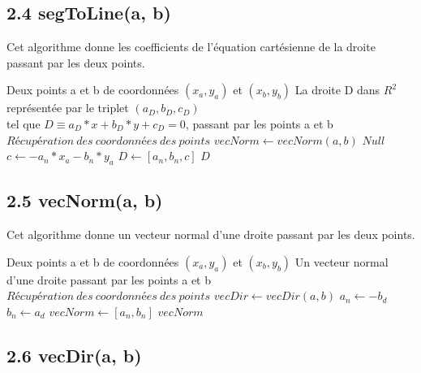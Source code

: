 \documentclass[a4paper,12pt]{report}	%
\begin{document}
	{\subsection*{2.4 segToLine(a, b)}}
	
	\noindent Cet algorithme donne les coefficients de l'équation cartésienne de la droite passant par les deux points.
	
	\begin{algorithm}
	\caption{$segToLine(a, b)$}
	\label{Modele pour un algo}
	\begin{algorithmic} [1]
	\REQUIRE Deux points a et b de coordonnées $(x_{a}, y_{a})$ et $(x_{b}, y_{b})$
	\ENSURE La droite D dans $R^2$ représentée par le triplet $(a_{D}, b_{D}, c_{D})$ \\tel que $D \equiv a_{D}*x + b_{D}*y + c_{D} = 0$, passant par les points a et b
	\STATE $Récupération\ des\ coordonnées\ des\ points$
	\STATE $ vecNorm \gets vecNorm(a, b) $
	\RETURN $Null$
	\ELSE
	\STATE $ c \gets - a_{n}*x_{a} - b_{n}*y_{a} $
	\STATE $ D \gets [a_{n}, b_{n}, c] $
	\RETURN $D$
	\ENDIF
	\end{algorithmic}
	\end{algorithm}
	
	{\subsection*{2.5 vecNorm(a, b)}}
	
	\noindent Cet algorithme donne un vecteur normal d'une droite passant par les deux points.
	
	\begin{algorithm}
	\caption{$vecNorm(a, b)$}
	\label{Modele pour un algo}
	\begin{algorithmic} [1]
	\REQUIRE Deux points a et b de coordonnées $(x_{a}, y_{a})$ et $(x_{b}, y_{b})$
	\ENSURE Un vecteur normal d’une droite passant par les points a et b
	\STATE $Récupération\ des\ coordonnées\ des\ points$
	\STATE $ vecDir \gets vecDir(a, b) $
	\STATE $ a_{n} \gets -b_{d} $
	\STATE $ b_{n} \gets a_{d} $
	\STATE $ vecNorm \gets [a_{n}, b_{n}] $
	\RETURN $ vecNorm $
	\end{algorithmic}
	\end{algorithm}
	
		\newpage

	{\subsection*{2.6 vecDir(a, b)}}
	
\end{document}
